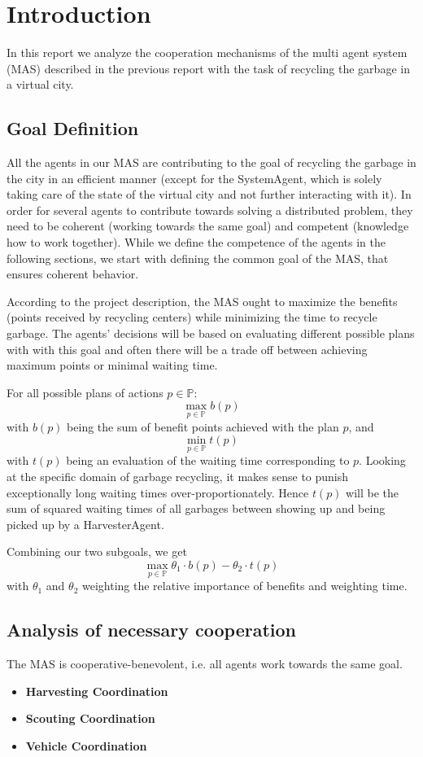 \section{Introduction}

In this report we analyze the cooperation mechanisms of the multi agent system (MAS) described in the previous report with the task of recycling the garbage in a virtual city.

\subsection{Goal Definition}
\label{sub:goal}

All the agents in our MAS are contributing to the goal of recycling the garbage in the city in an efficient manner (except for the SystemAgent, which is solely taking care of the state of the virtual city and not further interacting with it). In order for several agents to contribute towards solving a distributed problem, they need to be coherent (working towards the same goal) and competent (knowledge how to work together). While we define the competence of the agents in the following sections, we start with defining the common goal of the MAS, that ensures coherent behavior.

According to the project description, the MAS ought to maximize the benefits (points received by recycling centers) while minimizing the time to recycle garbage. The agents' decisions will be based on evaluating different possible plans with with this goal and often there will be a trade off between achieving maximum points or minimal waiting time. 

For all possible plans of actions $ p \in \mathbb{P} $: \[ \max_{p \in \mathbb{P}} b(p)\] with $ b(p) $ being the sum of benefit points achieved with the plan $p$, and \[ \min_{p \in \mathbb{P}} t(p)\] with $t(p)$ being an evaluation of the waiting time corresponding to $p$. Looking at the specific domain of garbage recycling, it makes sense to punish exceptionally long waiting times over-proportionately. Hence $ t(p) $ will be the sum of squared waiting times of all garbages between showing up and being picked up by a HarvesterAgent.

Combining our two subgoals, we get \[ \max_{p \in \mathbb{P}} \theta_1 \cdot b(p) - \theta_2 \cdot t(p)\] with $ \theta_1 $ and $ \theta_2 $ weighting the relative importance of benefits and weighting time.

\subsection{Analysis of necessary cooperation}

The MAS is cooperative-benevolent, i.e. all agents work towards the same goal.


\begin{itemize}
	\item \textbf{Harvesting Coordination}
	\item \textbf{Scouting Coordination}
	\item \textbf{Vehicle Coordination}
\end{itemize}